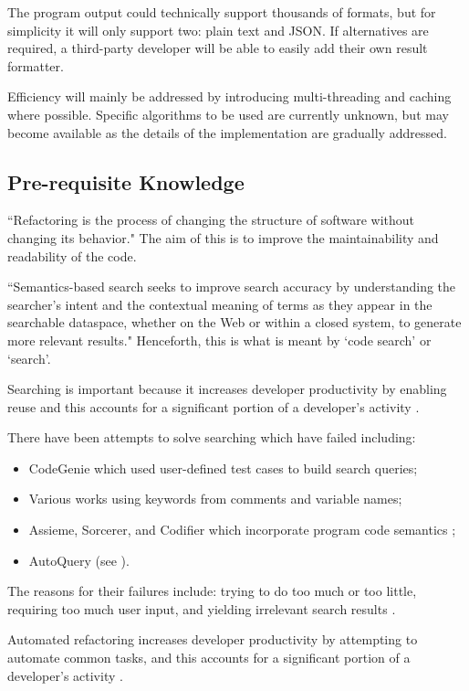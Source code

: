 \documentclass[12pt, letterpaper]{article}
\begin{document}
The program output could technically support thousands of formats, but for simplicity it will only support two: plain text and JSON.
If alternatives are required, a third-party developer will be able to easily add their own result formatter.

Efficiency will mainly be addressed by introducing multi-threading and caching where possible.
Specific algorithms to be used are currently unknown, but may become available as the details of the implementation are gradually addressed.

\subsection{Pre-requisite Knowledge}
``Refactoring is the process of changing the structure of software without changing its behavior." \autocite{murphy2012we} The aim of this is to improve the maintainability and readability of the code.

``Semantics-based search seeks to improve search accuracy by understanding the searcher's intent and the contextual meaning of terms as they appear in the searchable dataspace, whether on the Web or within a closed system, to generate more relevant results." \autocite{wikipediasemanticsearch} Henceforth, this is what is meant by `code search' or `search'.

Searching is important because it increases developer productivity by enabling reuse and this accounts for a significant portion of a developer's activity \autocite{reiss2009semantics,stolee2014solving}.

There have been attempts to solve searching which have failed including:
\begin{itemize}
  \item CodeGenie which used user-defined test cases to build search queries;
  \item Various works using keywords from comments and variable names;
  \item Assieme, Sorcerer, and Codifier which incorporate program code semantics \autocite{reiss2009semantics};
  \item AutoQuery (see ).
\end{itemize}

The reasons for their failures include: trying to do too much or too little, requiring too much user input, and yielding irrelevant search results \autocite{reiss2009semantics,stolee2014solving}.

Automated refactoring increases developer productivity by attempting to automate common tasks, and this accounts for a significant portion of a developer's activity \autocite{mens2004survey,murphy2012we}.
\end{document}
